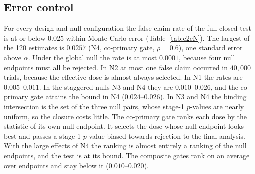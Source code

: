 \subsection{Error control}\label{sec:error}

\begin{table}
\centering\footnotesize
\caption{Run A in the null configurations ($n_1=100$): probability of proceeding to stage 2, false-claim rate and expected total sample size.}\label{tab:e2eN}

\end{table}

\begin{table}
\centering\scriptsize
\caption{False-claim rates (N1, N3, N4) and power (S1, S3) of the full, dose-level and per-endpoint closures at $n_1=100$.}\label{tab:closure}

\end{table}

For every design and null configuration the false-claim rate of the full closed test is at or below $0.025$ within Monte Carlo error (Table~\ref{tab:e2eN}). The largest of the 120 estimates is $0.0257$ (N4, co-primary gate, $\rho=0.6$), one standard error above $\alpha$. Under the global null the rate is at most $0.0001$, because four null endpoints must all be rejected. In N2 at most one false claim occurred in $40{,}000$ trials, because the effective dose is almost always selected. In N1 the rates are $0.005$--$0.011$. In the staggered nulls N3 and N4 they are $0.010$--$0.026$, and the co-primary gate attains the bound in N4 ($0.024$--$0.026$). In N3 and N4 the binding intersection is the set of the three null pairs, whose stage-1 $p$-values are nearly uniform, so the closure costs little. The co-primary gate ranks each dose by the statistic of its own null endpoint. It selects the dose whose null endpoint looks best and passes a stage-1 $p$-value biased towards rejection to the final analysis. With the large effects of N4 the ranking is almost entirely a ranking of the null endpoints, and the test is at its bound. The composite gates rank on an average over endpoints and stay below it ($0.010$--$0.020$).

\begin{table}
\centering\footnotesize
\caption{False-claim rate of the full closed test with Wald $p$-values in staggered nulls, for the co-primary gate without futility stopping.}\label{tab:level}

\end{table}

